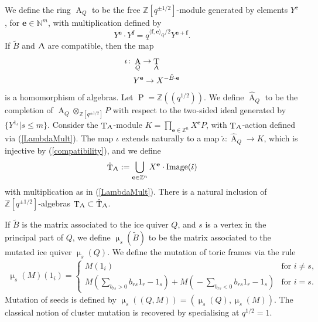 \documentclass[a4paper,10pt]{amsart}
\newcommand{\ee}{\mathbf{e}}
\newcommand{\ff}{\mathbf{f}}
\DeclareMathOperator{\PpP}{P}
\renewcommand{\Lambda}{\Uplambda}
\renewcommand{\mu}{\upmu}
\DeclareMathOperator{\Tor}{T}
\DeclareMathOperator{\Ror}{A}
\begin{document}
We define the ring $\Ror_Q$ to be the free $\mathbb{Z}[q^{\pm 1/2}]$-module generated by elements $Y^\ee$, for $\ee\in\mathbb{N}^m$, with multiplication defined by
\begin{equation}
\label{Ymult}
Y^\ee\cdot Y^\ff=q^{\langle \ff,\ee\rangle_Q/2}Y^{\ee+\ff}.
\end{equation}
If $\tilde{B}$ and $\Lambda$ are compatible, then the map
\begin{align}
\iota\colon&\Ror_Q\rightarrow\Tor_{\Lambda}\label{iotadef}\\
&Y^\ee\rightarrow X^{{}-\tilde{B}\cdot \ee}\nonumber
\end{align}
is a homomorphism of algebras.  Let $\PpP=\mathbb{Z}((q^{1/2}))$.  We define $\hat{\Ror}_Q$ to be the completion of $\Ror_Q\otimes_{\mathbb{Z}[q^{\pm 1/2}]} P$ with respect to the two-sided ideal generated by $\{Y^{1_s}|s\leq m\}$.  Consider the $\Tor_{\Lambda}$-module $K=\prod_{\ee\in\mathbb{Z}^n}X^{\ee}P$, with $\Tor_{\Lambda}$-action defined via (\ref{LambdaMult}).  The map $\iota$ extends naturally to a map $\hat{\iota}\colon\hat{\Ror}_Q\rightarrow K$, which is injective by (\ref{compatibility}), and we define
\[
\hat{\Tor}_{\Lambda}:=\bigcup_{\ee\in \mathbb{Z}^n}X^{\ee}\cdot \textrm{Image}(\hat{\iota})
\]
with multiplication as in (\ref{LambdaMult}).  There is a natural inclusion of $\mathbb{Z}[q^{\pm 1/2}]$-algebras $\Tor_{\Lambda}\subset\hat{\Tor}_{\Lambda}$.


If $\tilde{B}$ is the matrix associated to the ice quiver $Q$, and $s$ is a vertex in the principal part of $Q$, we define $\mu_s(\tilde{B})$ to be the matrix associated to the mutated ice quiver $\mu_s(Q)$.  We define the mutation of toric frames via the rule
\begin{align}\label{mutFram}
\mu_s(M)(1_i)=\begin{cases} M(1_i)& \textrm{for }i\neq s,\\ M\left(\sum_{b_{rs}>0}b_{rs}1_r-1_s\right)+ M\left({}-\sum_{b_{rs}<0}b_{rs}1_r-1_s\right) &\textrm{for }i=s.\end{cases}
\end{align}
Mutation of seeds is defined by $\mu_s((Q,M))=(\mu_s(Q),\mu_s(M))$.  The classical notion of cluster mutation is recovered by specialising at $q^{1/2}=1$.  
\end{document}
